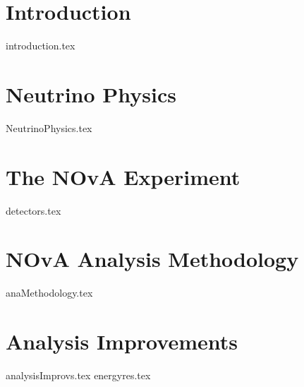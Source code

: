 \documentclass[a4paper,11pt]{report}
\newcommand{\linespacing}{1.5}
\renewcommand{\baselinestretch}{\linespacing}
\begin{document}

%
%
%

%
%
%
%
%
\newpage
{}



\chapter{Introduction}
{introduction.tex}

\chapter{Neutrino Physics}
{NeutrinoPhysics.tex}

\chapter{The NOvA Experiment}
{detectors.tex}

\chapter{NOvA Analysis Methodology}
{anaMethodology.tex}

\chapter{Analysis Improvements}
{analysisImprovs.tex}
{energyres.tex}
\end{document}
